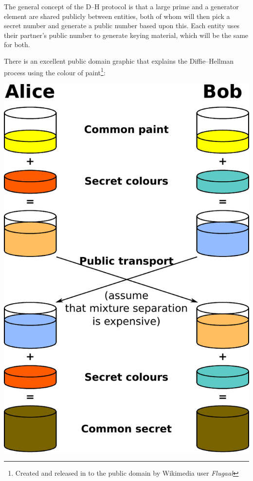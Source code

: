   The general concept of the D--H protocol is that a large prime and a generator element are shared publicly between entities, both of whom will then pick a secret number and generate a public number based upon this. Each entity uses their partner's public number to generate keying material, which will be the same for both.
  
  There is an excellent public domain graphic that explains the Diffie--Hellman process using the colour of paint\footnote{Created and released in to the public domain by Wikimedia user \emph{Flugaal}}:
  
  \begin{center}
    \includegraphics[scale=0.6]{./Figures/3-5-2a.pdf}
  \end{center}
  
